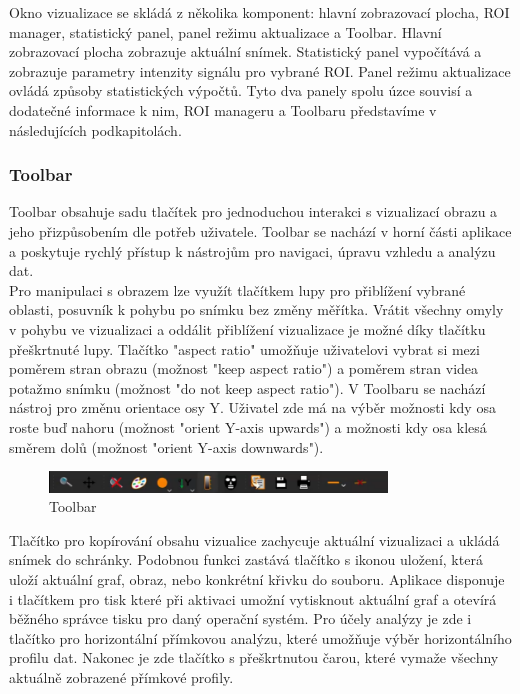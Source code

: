 \documentclass[a4paper,11pt]{article}
\begin{document}
Okno vizualizace se skládá z několika komponent: hlavní zobrazovací plocha, ROI manager, statistický panel, panel režimu aktualizace a Toolbar. Hlavní zobrazovací plocha zobrazuje aktuální snímek. Statistický panel vypočítává a zobrazuje parametry intenzity signálu pro vybrané ROI. Panel režimu aktualizace ovládá způsoby statistických výpočtů. Tyto dva panely spolu úzce souvisí a dodatečné informace k nim, ROI manageru a Toolbaru představíme v následujících podkapitolách. 

\subsubsection{Toolbar}
Toolbar obsahuje sadu tlačítek pro jednoduchou interakci s vizualizací obrazu a jeho přizpůsobením dle potřeb uživatele. Toolbar se nachází v horní části aplikace a poskytuje rychlý přístup k nástrojům pro navigaci, úpravu vzhledu a analýzu dat.\\

Pro manipulaci s obrazem lze využít tlačítkem lupy pro přiblížení vybrané oblasti, posuvník k pohybu po snímku bez změny měřítka. Vrátit všechny omyly v pohybu ve vizualizaci a oddálit přiblížení vizualizace je možné díky tlačítku přeškrtnuté lupy. Tlačítko "aspect ratio" umožňuje uživatelovi vybrat si mezi poměrem stran obrazu (možnost "keep aspect  ratio") a poměrem stran videa potažmo snímku (možnost "do not keep aspect ratio"). V Toolbaru se nachází nástroj pro změnu orientace osy Y. Uživatel zde má na výběr možnosti kdy osa roste buď nahoru (možnost "orient Y-axis upwards") a možnosti kdy osa klesá směrem dolů (možnost "orient Y-axis downwards").\\
\begin{figure}[H]
	\centering
	\includegraphics[width=0.8\textwidth]{images/Toolbar.png}
	\caption{Toolbar}
\end{figure}
Tlačítko pro kopírování obsahu vizualice zachycuje aktuální vizualizaci a ukládá snímek do schránky. Podobnou funkci zastává tlačítko s ikonou uložení, která uloží aktuální graf, obraz, nebo konkrétní křivku do souboru. Aplikace disponuje i tlačítkem pro tisk které při aktivaci umožní vytisknout aktuální graf a otevírá běžného správce tisku pro daný operační systém. Pro účely analýzy je zde i tlačítko pro horizontální přímkovou analýzu, které umožňuje výběr horizontálního profilu dat. Nakonec je zde tlačítko s přeškrtnutou čarou, které vymaže všechny aktuálně zobrazené přímkové profily.
\end{document}
